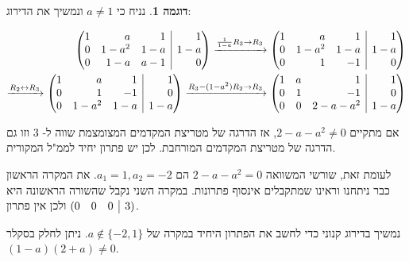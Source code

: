 \documentclass[12pt]{report}
\theoremstyle{plain}
\theoremstyle{definition}
\newtheorem{example}{דוגמה}[chapter]
\newcommand{\0}{\mathbf{0}}
\begin{document}
\begin{example}
נניח כי 
$a\neq 1$
ונמשיך את הדירוג:

$$
\begin{aligned}
\left(\begin{array}{@{}rrr|r@{}}
1 & a & 1 & 1 \\
0 & 1-a^2 & 1-a & 1-a\\
0 & 1-a & a-1 & 0
\end{array}\right)
\xrightarrow{\frac{1}{1-a}R_3\to R_3}
\left(\begin{array}{@{}rrr|r@{}}
1 & a & 1 & 1 \\
0 & 1-a^2 & 1-a & 1-a\\
0 & 1 & -1 & 0
\end{array}\right) \\
\xrightarrow{R_2\leftrightarrow R_3}
\left(\begin{array}{@{}rrr|r@{}}
1 & a & 1 & 1 \\
0 & 1 & -1 & 0\\
0 & 1-a^2 & 1-a & 1-a
\end{array}\right)
\xrightarrow{R_3-(1-a^2)R_2\to R_3}
\left(\begin{array}{@{}rrr|r@{}}
1 & a & 1 & 1 \\
0 & 1 & -1 & 0\\
0 & 0 & 2-a-a^2 & 1-a
\end{array}\right)
\end{aligned}
$$

אם מתקיים
$
2-a-a^2\neq 0
$,
אז הדרגה של מטריצת המקדמים המצומצמת שווה ל-
$3$
וזו גם הדרגה של מטריצת המקדמים המורחבת. לכן יש פתרון יחיד לממ"ל המקורית.

לעומת זאת, שורשי המשוואה
$2-a-a^2=0$
הם
$a_1=1, a_2=-2$.
את המקרה הראשון כבר ניתחנו וראינו שמתקבלים אינסוף פתרונות. במקרה השני נקבל שהשורה הראשונה היא 
$
(\begin{array}{@{}rrr|r@{}}
0 & 0 & 0 & 3 \\
\end{array})
$
ולכן אין פתרון.

נמשיך בדירוג קנוני כדי לחשב את הפתרון היחיד במקרה של 
$a\notin\{-2,1\}$. ניתן לחלק בסקלר
$(1-a)(2+a)\neq 0$.


\end{example}
\end{document}
